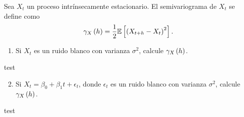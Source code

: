 \documentclass[../main.tex]{subfiles}
\begin{document}
    \begin{enunciado}
    	Sea $X_t$ un proceso intrínsecamente estacionario. El semivariograma de $X_t$ se define como
            \begin{align*}
            	\gamma_X\left( h \right) = \frac 1 2 \mathbb{E} \left[ \left( X_{t+h} - X_t \right)^2 \right].
            \end{align*}
        \begin{enumerate}
        	\item Si $X_t$ es un ruido blanco con varianza $\sigma^2$, calcule $\gamma_X\left( h \right)$.
        \end{enumerate}
    \end{enunciado}
    
    \begin{demostracion}
        test
    \end{demostracion}
    \vspace{1em}
    \begin{enunciado}
    	\begin{enumerate}
    		\setcounter{enumi}{1}
    		\item Si $X_t = \beta_0 + \beta_1 t + \epsilon_t$, donde $\epsilon_t$ es un ruido blanco con varianza $\sigma^2$, calcule $\gamma_X\left( h \right)$.
    	\end{enumerate}
    \end{enunciado}
    
    \begin{demostracion}
    	test
    \end{demostracion}
\end{document}
